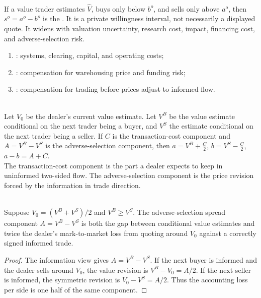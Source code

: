 \documentclass[a4paper,oneside,openany]{book}
\begin{document}
\begin{definition} \\
If a value trader estimates $\widehat{V}$, buys only below $b^o$, and sells only above $a^o$, then $s^o=a^o-b^o$ is the . It is a private willingness interval, not necessarily a displayed quote. It widens with valuation uncertainty, research cost, impact, financing cost, and adverse-selection risk.
\end{definition}

\begin{taxonomy} 
\begin{enumerate}[label=\roman*.]
\setlength{\itemsep}{0pt}
\item {}: systems, clearing, capital, and operating costs;
\item {}: compensation for warehousing price and funding risk;
\item {}: compensation for trading before prices adjust to informed flow.
\end{enumerate}
\end{taxonomy}

\begin{model} \\
Let $V_0$ be the dealer's current value estimate. Let $V^B$ be the value estimate conditional on the next trader being a buyer, and $V^S$ the estimate conditional on the next trader being a seller. If $C$ is the transaction-cost component and $A=V^B-V^S$ is the adverse-selection component, then $a=V^B+\frac{C}{2}$, $b=V^S-\frac{C}{2}$, $a-b=A+C$.\\
The transaction-cost component is the part a dealer expects to keep in uninformed two-sided flow. The adverse-selection component is the price revision forced by the information in trade direction.
\end{model}

\begin{proposition} \\
Suppose $V_0=(V^B+V^S)/2$ and $V^B\geq V^S$. The adverse-selection spread component $A=V^B-V^S$ is both the gap between conditional value estimates and twice the dealer's mark-to-market loss from quoting around $V_0$ against a correctly signed informed trade.
\begin{proof}
The information view gives $A=V^B-V^S$. If the next buyer is informed and the dealer sells around $V_0$, the value revision is $V^B-V_0=A/2$. If the next seller is informed, the symmetric revision is $V_0-V^S=A/2$. Thus the accounting loss per side is one half of the same component.
\end{proof}
\end{proposition}
\end{document}
